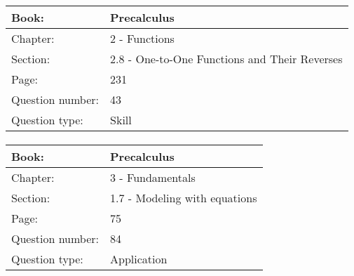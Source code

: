 \documentclass{article}
\begin{document}
   \paragraph{}
   \begin{tabularx}{1\textwidth}{
           p{}
           p{}
       }
       \toprule
       Book: & Precalculus
       \\
       \midrule
       Chapter: & 2 - Functions
       \\
       \midrule
       Section: & 2.8 - One-to-One Functions and Their Reverses
       \\
       \midrule
       Page: & 231
       \\
       \midrule
       Question number: & 43
       \\
       \midrule
       Question type: & Skill
       \\
       \bottomrule
   \end{tabularx}



   \paragraph{}
   \begin{tabularx}{1\textwidth}{
           p{}
           p{}
       }
       \toprule
       Book: & Precalculus
       \\
       \midrule
       Chapter: & 3 - Fundamentals
       \\
       \midrule
       Section: & 1.7 - Modeling with equations
       \\
       \midrule
       Page: & 75
       \\
       \midrule
       Question number: & 84
       \\
       \midrule
       Question type: & Application
       \\
       \bottomrule
   \end{tabularx}
\end{document}
